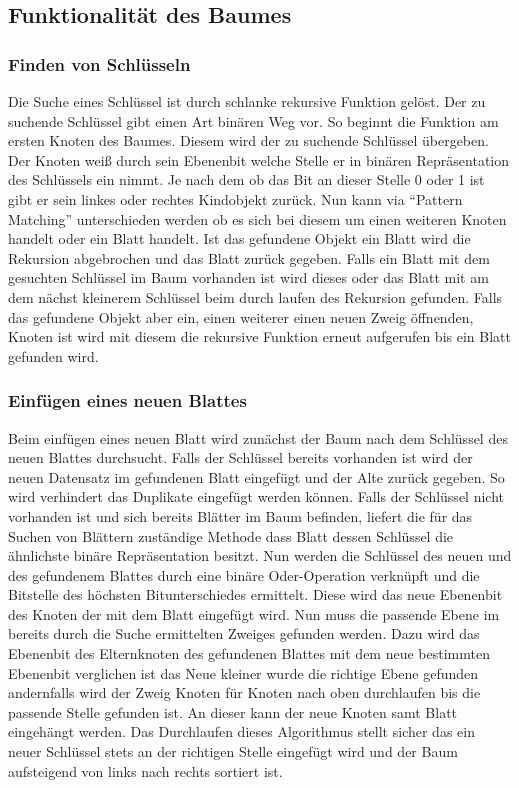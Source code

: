 \documentclass[a4paper,11pt,oneside,%
headsepline,												%
footsepline,												%
bibtotocnumbered									%
]{scrreprt}
\begin{document}
\subsection{Funktionalität des Baumes}
\subsubsection{Finden von Schlüsseln}
\label{sssec:FindKey}
Die Suche eines Schlüssel ist durch schlanke rekursive Funktion gelöst. Der zu suchende Schlüssel gibt einen Art binären Weg vor. So beginnt die Funktion am ersten Knoten des Baumes. Diesem wird der zu suchende Schlüssel übergeben. Der Knoten weiß durch sein Ebenenbit welche Stelle er in binären Repräsentation des Schlüssels ein nimmt. Je nach dem ob das Bit an dieser Stelle 0 oder 1 ist gibt er sein linkes oder rechtes Kindobjekt zurück. Nun kann via \enquote{Pattern Matching} unterschieden werden ob es sich bei diesem um einen weiteren Knoten handelt oder ein Blatt handelt. Ist das gefundene Objekt ein Blatt wird die Rekursion abgebrochen und das Blatt zurück gegeben. Falls ein Blatt mit dem gesuchten Schlüssel im Baum vorhanden ist wird dieses oder das Blatt mit am dem nächst kleinerem Schlüssel beim durch laufen des Rekursion gefunden. Falls das gefundene Objekt aber ein, einen weiterer einen neuen Zweig öffnenden, Knoten ist wird mit diesem die rekursive Funktion erneut aufgerufen bis ein Blatt gefunden wird.
\subsubsection{Einfügen eines neuen Blattes}
Beim einfügen eines neuen Blatt wird zunächst der Baum nach dem Schlüssel des neuen Blattes durchsucht. Falls der Schlüssel bereits vorhanden ist wird der neuen Datensatz im gefundenen Blatt eingefügt und der Alte zurück gegeben. So wird verhindert das Duplikate eingefügt werden können. Falls der Schlüssel nicht vorhanden ist und sich bereits Blätter im Baum befinden, liefert die für das Suchen von Blättern zuständige Methode dass Blatt dessen Schlüssel die ähnlichste binäre Repräsentation besitzt. Nun werden die Schlüssel des neuen und des gefundenem Blattes durch eine binäre Oder-Operation verknüpft und die Bitstelle des höchsten Bitunterschiedes ermittelt. Diese wird das neue Ebenenbit des Knoten der mit dem Blatt eingefügt wird. Nun muss die passende Ebene im bereits durch die Suche ermittelten Zweiges gefunden werden. Dazu wird das Ebenenbit des Elternknoten des gefundenen Blattes mit dem neue bestimmten Ebenenbit verglichen ist das Neue kleiner wurde die richtige Ebene gefunden andernfalls wird der Zweig Knoten für Knoten nach oben durchlaufen bis die passende Stelle gefunden ist. An dieser kann der neue Knoten samt Blatt eingehängt werden. Das Durchlaufen dieses Algorithmus stellt sicher das ein neuer Schlüssel stets an der richtigen Stelle eingefügt wird und der Baum aufsteigend von links nach rechts sortiert ist.
\end{document}
